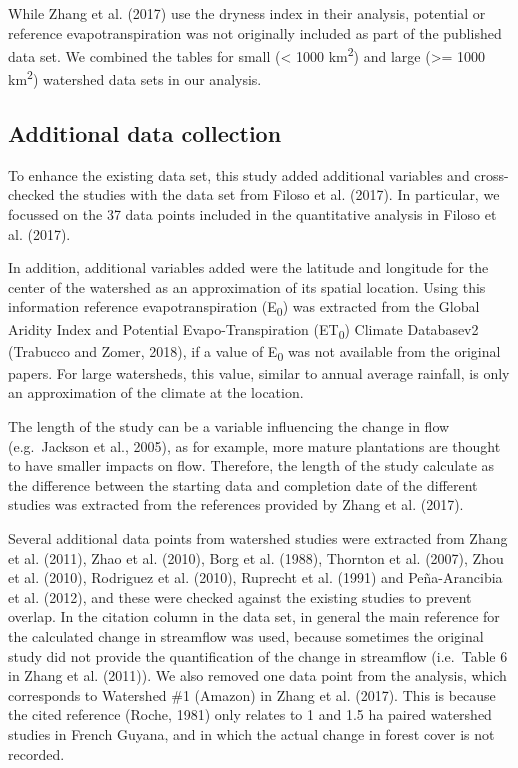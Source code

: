 \documentclass[]{elsarticle} %
\begin{document}
While Zhang et al. (2017) use the dryness index in their analysis,
potential or reference evapotranspiration was not originally included as
part of the published data set. We combined the tables for small
(\textless{} 1000 km\textsuperscript{2}) and large (\textgreater= 1000
km\textsuperscript{2}) watershed data sets in our analysis.

\hypertarget{additional-data-collection}{%
\subsection{Additional data
collection}\label{additional-data-collection}}

To enhance the existing data set, this study added additional variables
and cross-checked the studies with the data set from Filoso et al.
(2017). In particular, we focussed on the 37 data points included in the
quantitative analysis in Filoso et al. (2017).

In addition, additional variables added were the latitude and longitude
for the center of the watershed as an approximation of its spatial
location. Using this information reference evapotranspiration
(E\textsubscript{0}) was extracted from the Global Aridity Index and
Potential Evapo-Transpiration (ET\textsubscript{0}) Climate Databasev2
(Trabucco and Zomer, 2018), if a value of E\textsubscript{0} was not
available from the original papers. For large watersheds, this value,
similar to annual average rainfall, is only an approximation of the
climate at the location.

The length of the study can be a variable influencing the change in flow
(e.g.~Jackson et al., 2005), as for example, more mature plantations are
thought to have smaller impacts on flow. Therefore, the length of the
study calculate as the difference between the starting data and
completion date of the different studies was extracted from the
references provided by Zhang et al. (2017).

Several additional data points from watershed studies were extracted
from Zhang et al. (2011), Zhao et al. (2010), Borg et al. (1988),
Thornton et al. (2007), Zhou et al. (2010), Rodriguez et al. (2010),
Ruprecht et al. (1991) and Peña-Arancibia et al. (2012), and these were
checked against the existing studies to prevent overlap. In the citation
column in the data set, in general the main reference for the calculated
change in streamflow was used, because sometimes the original study did
not provide the quantification of the change in streamflow (i.e.~Table 6
in Zhang et al. (2011)). We also removed one data point from the
analysis, which corresponds to Watershed \#1 (Amazon) in Zhang et al.
(2017). This is because the cited reference (Roche, 1981) only relates
to 1 and 1.5 ha paired watershed studies in French Guyana, and in which
the actual change in forest cover is not recorded.
\end{document}
